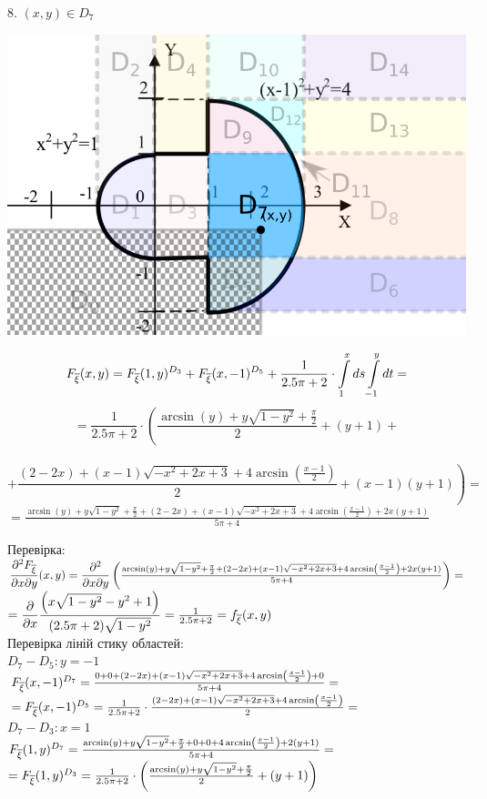 \documentclass[14pt,a4paper]{scrartcl}
\theoremstyle{definition}
\theoremstyle{remark}
\theoremstyle{definition}
\theoremstyle{definition}
\begin{document}
8. $(x,y) \in D_7$
\begin{center} \includegraphics[scale=0.3]{assets/zone885.png} \end{center}
$$
F_{\overline{\xi}} (x,y) =  F_{\overline{\xi}} (1, y)^{D_3} + F_{\overline{\xi}} (x, -1)^{D_5} +\frac{1}{2.5\pi + 2} \cdot  \int\limits_{1}^{ x}{ds  \int\limits_{-1}^{ y}{ dt}} =
$$
$$
= \frac{1}{2.5\pi + 2} \cdot \left( \dfrac{\arcsin\left(y\right)+y\sqrt{1-y^2} + \frac{\pi}{2} }{2}+ (y+1) \right.+$$\\$$+\left. \dfrac{\left(2-2x\right)+\left(x-1\right)\sqrt{-x^2+2x+3}+4\arcsin\left(\frac{x-1}{2}\right)}{2} + (x-1)(y+1)\right)=
$$
$
=\frac{\arcsin\left(y\right)+y\sqrt{1-y^2} + \frac{\pi}{2} + \left(2-2x\right)+\left(x-1\right)\sqrt{-x^2+2x+3}+4\arcsin\left(\frac{x-1}{2}\right)+ 2x(y+1)}{5\pi + 4}
$

Перевірка:\\
$\dfrac{\partial^2 F_{\overline{\xi}}}{\partial x \partial y}(x,y) =
\dfrac{\partial^2}{\partial x \partial y} \left(  \frac{\arcsin\left(y\right)+y\sqrt{1-y^2} + \frac{\pi}{2} + \left(2-2x\right)+\left(x-1\right)\sqrt{-x^2+2x+3}+4\arcsin\left(\frac{x-1}{2}\right)+ 2x(y+1)}{5\pi + 4}
\right) =$\\
$= \dfrac{\partial}{ \partial x} {\dfrac{\left(x\sqrt{1-y^2}-y^2+1\right)}{(2.5\pi + 2)\sqrt{1-y^2}}} = \frac{1}{2.5\pi + 2}=f_{\overline{\xi}} (x,y)$\\

Перевірка ліній стику областей:\\
$D_7 - D_5: y = -1$\\
$ F_{\overline{\xi}} (x,-1)^{D_7} =  \frac{0+0 + \left(2-2x\right)+\left(x-1\right)\sqrt{-x^2+2x+3}+4\arcsin\left(\frac{x-1}{2}\right)+0}{5\pi + 4} =$\\$= F_{\overline{\xi}} (x,-1)^{D_5}= \frac{1}{2.5\pi + 2} \cdot \frac{\left(2-2x\right)+\left(x-1\right)\sqrt{-x^2+2x+3}+4\arcsin\left(\frac{x-1}{2}\right)}{2} = $\\
$D_7 - D_3 : x = 1$\\
$ F_{\overline{\xi}} (1,y)^{D_7} = \frac{\arcsin\left(y\right)+y\sqrt{1-y^2} + \frac{\pi}{2} + 0+0+4\arcsin\left(\frac{x-1}{2}\right)+ 2(y+1)}{5\pi + 4} =$\\
$= F_{\overline{\xi}} (1,y)^{D_3} = \frac{1}{2.5\pi + 2} \cdot \left( \frac{\arcsin\left(y\right)+y\sqrt{1-y^2} + \frac{\pi}{2} }{2}+ (y+1)\right)$
\newpage
\end{document}
